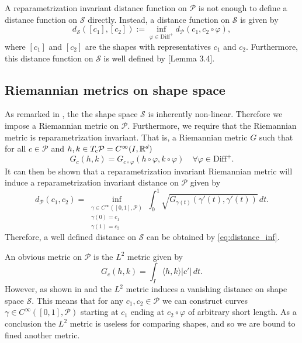 A reparametrization invariant distance function on \(\mathcal{P}\) is not enough to define a distance function on \(\mathcal{S}\) directly. Instead, a distance function on \(\mathcal{S}\) is given by 
\begin{equation}
  d_\mathcal{S} ([c_1],[c_2]) := \inf_{\varphi \in \text{Diff}^+}{  d_{\mathcal{P}}(c_1,c_2 \circ \varphi)},
  \label{eq:distance_inf}
\end{equation}
where  \([c_1]\) and  \([c_2]\) are the shapes with representatives \(c_1\) and  \(c_2\). Furthermore, this distance function on \(\mathcal{S}\) is well defined by \cite{celledoni2016}[Lemma 3.4].


\subsection{Riemannian metrics on shape space}
As remarked in \cite{bauer2014overview}, the the shape space \(\mathcal{S}\) is inherently non-linear. Therefore we impose a Riemannian metric  on \(\mathcal{P}\). Furthermore, we require that the Riemannian metric is reparametrization invariant. That is, a Riemannian metric \(G\) such that for all \( c \in \mathcal{P}\) and \(h,k \in  T_c \mathcal{P} = C^\infty(I, \mathbb{R}^d) \)
\begin{equation*}
  G_c(h,k) = G_{c \circ \varphi}(h\circ \varphi, k \circ \varphi) \quad \forall \varphi \in \text{Diff}^+.
\end{equation*}
It can then be shown that a reparametrization invariant Riemannian metric will  induce a reparametrization invariant distance on \(\mathcal{P}\) given by
\begin{equation*}
  d_\mathcal{P}(c_1, c_2) = \inf_{
    \substack{
      \gamma \in C^{\infty}([0,1], \mathcal{P}) \\
      \gamma(0) = c_1 \\
      \gamma(1) = c_2
    }
  } \int_0^1 \sqrt{G_{\gamma(t)}(\gamma'(t),\gamma'(t))} \, dt.
\end{equation*}
Therefore, a well defined distance on \(\mathcal{S}\) can be obtained by \eqref{eq:distance_inf}. 

An obvious metric on \(\mathcal{P}\) is the \(L^2\) metric  given by
\begin{equation*}
  G_c(h,k) = \int_I \langle h, k\rangle \vert c'\vert \,dt.
\end{equation*}
However, as shown in \cite{michor2003vanishingl2} and \cite{michor2004vanishing_generalized} the \(L^2\) metric induces a vanishing distance on shape space \(\mathcal{S}\). This means that for any \(c_1, c_2 \in \mathcal{P}\) we can construct curves \(\gamma \in C^{\infty}([0,1],\mathcal{P})\) starting at \(c_1\) ending at \(c_2 \circ \varphi\) of arbitrary short length. As a conclusion the \(L^2\) metric is useless for comparing shapes, and so we are bound to fined another metric.


